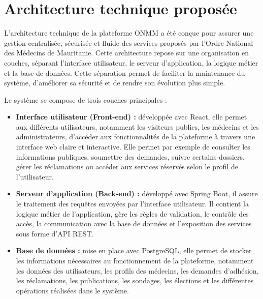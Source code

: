 ﻿\documentclass[12pt,a4paper]{report}
\begin{document}
\section{Architecture technique proposée}

L'architecture technique de la plateforme ONMM a été conçue pour assurer une
gestion centralisée, sécurisée et fluide des services proposés par l'Ordre
National des Médecins de Mauritanie. Cette architecture repose sur une
organisation en couches, séparant l'interface utilisateur, le serveur
d'application, la logique métier et la base de données. Cette séparation permet
de faciliter la maintenance du système, d'améliorer sa sécurité et de rendre son
évolution plus simple.

Le système se compose de trois couches principales :

\begin{itemize}
    \item \textbf{Interface utilisateur (Front-end) :} développée avec React,
    elle permet aux différents utilisateurs, notamment les visiteurs publics,
    les médecins et les administrateurs, d'accéder aux fonctionnalités de la
    plateforme à travers une interface web claire et interactive. Elle permet
    par exemple de consulter les informations publiques, soumettre des demandes,
    suivre certains dossiers, gérer les réclamations ou accéder aux services
    réservés selon le profil de l'utilisateur.

    \item \textbf{Serveur d'application (Back-end) :} développé avec Spring
    Boot, il assure le traitement des requêtes envoyées par l'interface
    utilisateur. Il contient la logique métier de l'application, gère les règles
    de validation, le contrôle des accès, la communication avec la base de
    données et l'exposition des services sous forme d'API REST.

    \item \textbf{Base de données :} mise en place avec PostgreSQL, elle permet
    de stocker les informations nécessaires au fonctionnement de la plateforme,
    notamment les données des utilisateurs, les profils des médecins, les
    demandes d'adhésion, les réclamations, les publications, les sondages, les
    élections et les différentes opérations réalisées dans le système.
\end{itemize}


\end{document}
